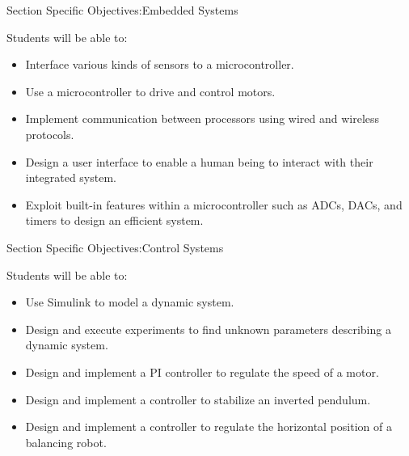 \begin{frame}{Section Specific Objectives:}{Embedded Systems}
\begin{block}{Students will be able to:}
\begin{itemize}
\item  Interface various kinds of sensors to a microcontroller.
\item  Use a microcontroller to drive and control  motors. 
\item  Implement communication between processors using wired and wireless protocols.
\item  Design a user interface to enable a human being to interact with their integrated system.
\item  Exploit built-in features within a microcontroller such as ADCs, DACs, and timers to design an efficient system.
\end{itemize}
\end{block}
\end{frame}


\begin{frame}{Section Specific Objectives:}{Control Systems}
\begin{block}{Students will be able to:}
\begin{itemize}
\item Use Simulink to model a dynamic system.
\item Design and execute experiments to find unknown parameters describing a dynamic system.
\item Design and implement a PI controller to regulate the speed of a motor.
\item Design and implement a controller to stabilize an inverted pendulum.
\item Design and implement a controller to regulate the horizontal position of a balancing robot.
\end{itemize}
\end{block}
\end{frame}

